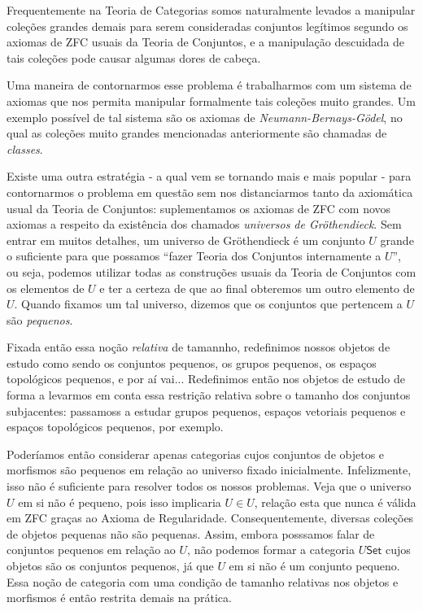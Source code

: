 \begin{obs}
    \label{obs:questoes_de_tamanho}
    Frequentemente na Teoria de Categorias somos naturalmente levados a manipular coleções grandes demais para serem consideradas conjuntos legítimos segundo os axiomas de ZFC usuais da Teoria de Conjuntos, e a manipulação descuidada de tais coleções pode causar algumas dores de cabeça.
    
    Uma maneira de contornarmos esse problema é trabalharmos com um sistema de axiomas que nos permita manipular formalmente tais coleções muito grandes.
    Um exemplo possível de tal sistema são os axiomas de \emph{Neumann-Bernays-Gödel}, no qual as coleções muito grandes mencionadas anteriormente são chamadas de \emph{classes}.

    Existe uma outra estratégia - a qual vem se tornando mais e mais popular -  para contornarmos o problema em questão sem nos distanciarmos tanto da axiomática usual da Teoria de Conjuntos: suplementamos os axiomas de ZFC com novos axiomas a respeito da existência dos chamados \emph{universos de Gröthendieck}.
    Sem entrar em muitos detalhes, um universo de Gröthendieck é um conjunto $U$ grande o suficiente para que possamos ``fazer Teoria dos Conjuntos internamente a $U$'', ou seja, podemos utilizar todas as construções usuais da Teoria de Conjuntos com os elementos de $U$ e ter a certeza de que ao final obteremos um outro elemento de $U$.
    Quando fixamos um tal universo, dizemos que os conjuntos que pertencem a $U$ são \emph{pequenos}.
   
    Fixada então essa noção \emph{relativa} de tamannho, redefinimos nossos objetos de estudo como sendo os conjuntos pequenos, os grupos pequenos, os espaços topológicos pequenos, e por aí vai...
    Redefinimos então nos objetos de estudo de forma a levarmos em conta essa restrição relativa sobre o tamanho dos conjuntos subjacentes: passamoss a estudar grupos pequenos, espaços vetoriais pequenos e espaços topológicos pequenos, por exemplo.

    Poderíamos então considerar apenas categorias cujos conjuntos de objetos e morfismos são pequenos em relação ao universo fixado inicialmente.
    Infelizmente, isso não é suficiente para resolver todos os nossos problemas.
    Veja que o universo $U$ em si não é pequeno, pois isso implicaria $U \in U$, relação esta que nunca é válida em ZFC graças ao Axioma de Regularidade.
    Consequentemente, diversas coleções de objetos pequenas não são pequenas.
    Assim, embora posssamos falar de conjuntos pequenos em relação ao $U$, não podemos formar a categoria $U\mathsf{Set}$ cujos objetos são os conjuntos pequenos, já que $U$ em si não é um conjunto pequeno.
    Essa noção de categoria com uma condição de tamanho relativas nos objetos e morfismos é então restrita demais na prática.


\end{obs}
